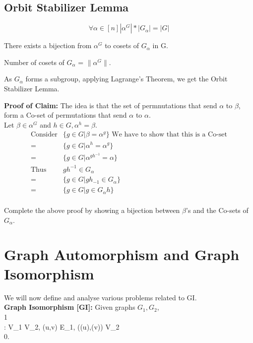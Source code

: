 \subsection{Orbit Stabilizer Lemma}





\[\forall \alpha \in [n] |\alpha^G|*|G_{\alpha}| = |G| \]
\begin{claim}
There exists a bijection from $\alpha^G$ to cosets of $G_{\alpha}$ in G.
\end{claim}
\begin{corollary}
Number of cosets of $G_{\alpha}$ = $\|\alpha^G\|$.
\end{corollary}
As $G_{\alpha}$ forms a subgroup, applying Lagrange's Theorem, we get the Orbit Stabilizer Lemma.

\textbf{Proof of Claim:}
The idea is that the set of permnutations that send $\alpha$ to $\beta$, form a Co-set of permutations that send $\alpha$ to $\alpha$.
\\
Let $\beta \in \alpha^G$ and $h \in G,\alpha^h = \beta$.\\
\begin{align*}
\text{Consider} & \{g \in G| \beta = \alpha^g\}
\text{  We have to show that this is a Co-set}\\
 = & \{ g \in G | \alpha^h = \alpha^g \}\\
 = & \{ g \in G | \alpha^{gh^{-1}} = \alpha\}\\
\text{Thus } &  gh^{-1} \in G_{\alpha}\\
 = & \{ g \in G | gh_{-1} \in G_{\alpha} \}\\
 = & \{ g \in G | g \in G_{\alpha}h \}\\
\end{align*}

\begin{exercise}
 Complete the above proof by showing a bijection between $\beta$'s and the Co-sets of $G_{\alpha}$.
\end{exercise}

\section{Graph Automorphism and Graph Isomorphism}
We will now define and analyse various problems related to GI.\\
\textbf{Graph Isomorphism [GI]: } Given graphs $G_1, G_2$,\\
  1 \\  \exists \sigma : V_1 \rightarrow V_2, \forall (u,v) \in E_1, (\sigma(u),\sigma(v)) \in V_2\\
   0.\\  

